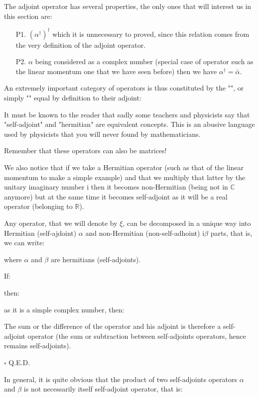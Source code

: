 	The adjoint operator has several properties, the only ones that will interest us in this section are:
	\begin{enumerate}
		\item[P1.] $(\alpha^\dagger)^\dagger$ which it is unnecessary to proved, since this relation comes from the very definition of the adjoint operator.
	
		\item[P2.] $\alpha$ being considered as a complex number (special case of operator such as the linear momentum one that we have seen before) then we have $\alpha^\dagger=\bar{\alpha}$.
	\end{enumerate}
	An extremely important category of operators is thus constituted by the "", or simply "" equal by definition to their adjoint:
	
	It must be known to the reader that sadly some teachers and physicists say	that "self-adjoint" and "hermitian" are equivalent concepts. This is an abusive language used by physicists that you will never found by mathematicians. 
	\begin{tcolorbox}[title=Remark,colframe=black,arc=10pt]
	Remember that these operators can also be matrices!
	\end{tcolorbox}
	We also notice that if we take a Hermitian operator (such as that of the linear momentum to make a simple example) and that we multiply that latter by the unitary imaginary number $\mathrm{i}$ then it becomes non-Hermitian\label{non-hermitian operator} (being not in $\mathbb{C}$ anymore) but at the same time it becomes self-adjoint as it will be a real operator (belonging to $\mathbb{R}$).
	\begin{theorem}
	Any operator, that we will denote by $\xi$, can be decomposed in a unique way into Hermitian (self-ajdoint) $\alpha$ and non-Hermitian (non-self-adhoint) $\mathrm{i}\beta$ parts, that is, we can write:
	
	where $\alpha$ and $\beta$ are hermitians (self-adjoints).
	\end{theorem}

	\begin{dem}
	If:
	
	then:
	
	as it is a simple complex number, then:
	
	The sum or the difference of the operator and his adjoint is therefore a self-adjoint operator (the sum or subtraction between self-adjoints operators, hence remains self-adjoints).
	\begin{flushright}
		$\square$  Q.E.D.
	\end{flushright}
	\end{dem}
	In general, it is quite obvious that the product of two self-adjoints operators $\alpha$ and $\beta$  is not necessarily itself self-adjoint operator, that is:
	
